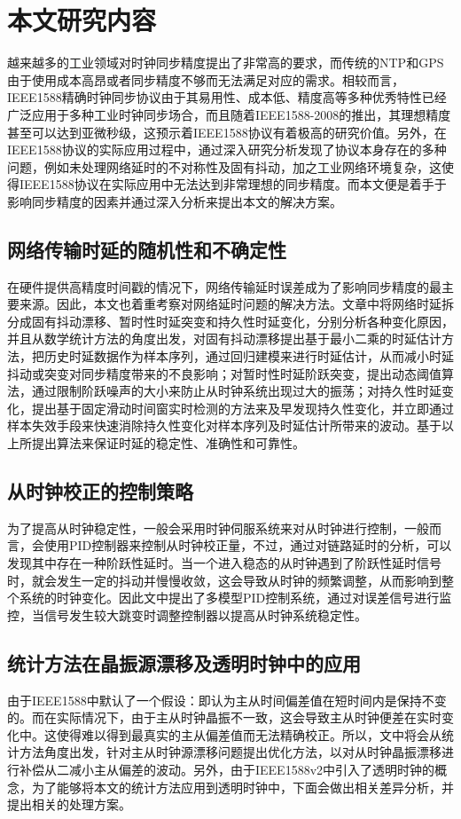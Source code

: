 \section{本文研究内容}
越来越多的工业领域对时钟同步精度提出了非常高的要求，而传统的NTP和GPS由于使用成本高昂或者同步精度不够而无法满足对应的需求。相较而言，IEEE1588精确时钟同步协议由于其易用性、成本低、精度高等多种优秀特性已经广泛应用于多种工业时钟同步场合，而且随着IEEE1588-2008的推出，其理想精度甚至可以达到亚微秒级，这预示着IEEE1588协议有着极高的研究价值。另外，在IEEE1588协议的实际应用过程中，通过深入研究分析发现了协议本身存在的多种问题，例如未处理网络延时的不对称性及固有抖动，加之工业网络环境复杂，这使得IEEE1588协议在实际应用中无法达到非常理想的同步精度。而本文便是着手于影响同步精度的因素并通过深入分析来提出本文的解决方案。

\subsection{网络传输时延的随机性和不确定性}
在硬件提供高精度时间戳的情况下，网络传输延时误差成为了影响同步精度的最主要来源。因此，本文也着重考察对网络延时问题的解决方法。文章中将网络时延拆分成固有抖动漂移、暂时性时延突变和持久性时延变化，分别分析各种变化原因，并且从数学统计方法的角度出发，对固有抖动漂移提出基于最小二乘的时延估计方法，把历史时延数据作为样本序列，通过回归建模来进行时延估计，从而减小时延抖动或突变对同步精度带来的不良影响；对暂时性时延阶跃突变，提出动态阈值算法，通过限制阶跃噪声的大小来防止从时钟系统出现过大的振荡；对持久性时延变化，提出基于固定滑动时间窗实时检测的方法来及早发现持久性变化，并立即通过样本失效手段来快速消除持久性变化对样本序列及时延估计所带来的波动。基于以上所提出算法来保证时延的稳定性、准确性和可靠性。

\subsection{从时钟校正的控制策略}
为了提高从时钟稳定性，一般会采用时钟伺服系统来对从时钟进行控制，一般而言，会使用PID控制器来控制从时钟校正量，不过，通过对链路延时的分析，可以发现其中存在一种阶跃性延时。当一个进入稳态的从时钟遇到了阶跃性延时信号时，就会发生一定的抖动并慢慢收敛，这会导致从时钟的频繁调整，从而影响到整个系统的时钟变化。因此文中提出了多模型PID控制系统，通过对误差信号进行监控，当信号发生较大跳变时调整控制器以提高从时钟系统稳定性。

\subsection{统计方法在晶振源漂移及透明时钟中的应用}
由于IEEE1588中默认了一个假设：即认为主从时间偏差值在短时间内是保持不变的。而在实际情况下，由于主从时钟晶振不一致，这会导致主从时钟便差在实时变化中。这使得难以得到最真实的主从偏差值而无法精确校正。所以，文中将会从统计方法角度出发，针对主从时钟源漂移问题提出优化方法，以对从时钟晶振漂移进行补偿从二减小主从偏差的波动。另外，由于IEEE1588v2中引入了透明时钟的概念，为了能够将本文的统计方法应用到透明时钟中，下面会做出相关差异分析，并提出相关的处理方案。

